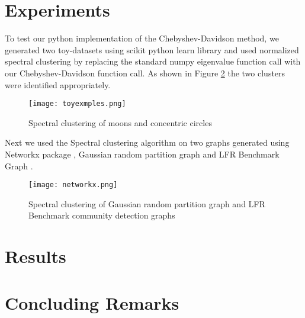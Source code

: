\documentclass[10pt,a4paper, nocenter]{article}
\begin{document}
    
    
    \section{Experiments}
	To test our python implementation of the Chebyshev-Davidson method, we generated two toy-datasets using scikit python learn library and used normalized spectral clustering  by replacing the standard numpy eigenvalue function call with our Chebyshev-Davidson function call. As shown in Figure \ref{fig:toyExamples} the two clusters were identified appropriately. 
		
    \begin{figure}[h]
		\texttt{[image: toyexmples.png]}
		\caption{Spectral clustering of moons and concentric circles}
		\label{fig:toyExamples}
	\end{figure}
	
	Next we used the Spectral clustering algorithm on two graphs generated using Networkx package \cite{networkx}, Gaussian random partition graph \cite{networkx_gaussian} and LFR Benchmark Graph \cite{networkx_lfr}. 
    \begin{figure}[h]
		\texttt{[image: networkx.png]}
		\caption{Spectral clustering of Gaussian random partition graph and LFR Benchmark community detection graphs}
		\label{fig:toyExamples}
	\end{figure}
    
    \section{Results}
    
    
    \section{Concluding Remarks}
    
	\thispagestyle{fancy}
	
	 
	
\end{document}

